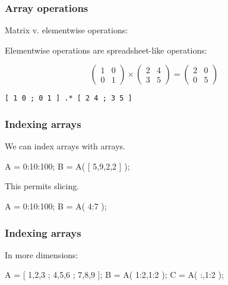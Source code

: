 \documentclass[11pt]{beamer}
\begin{document}
\begin{frame}[fragile]
  \frametitle{Array operations}
  \Enlarge

  \begin{enumerate}
  \myitem  Matrix v. elementwise operations:
    \begin{enumerate}
    \mysubitem  Elementwise operations are spreadsheet-like operations:
    \end{enumerate}
  \end{enumerate}
  $$
\left( \begin{array}{cc}
  1 & 0 \\
  0 & 1
\end{array} \right)
\times
\left( \begin{array}{cc}
  2 & 4 \\
  3 & 5
\end{array} \right)
=
\left( \begin{array}{cc}
  2 & 0 \\
  0 & 5
\end{array} \right)
  $$
  \pause
  \begin{Verbatim}
[ 1 0 ; 0 1 ] .* [ 2 4 ; 3 5 ]
  \end{Verbatim}
\end{frame}

\begin{frame}[fragile]
  \frametitle{Indexing arrays}
  \Enlarge

  \begin{enumerate}
  \myitem  We can index arrays with arrays.
  \end{enumerate}
  \begin{semiverbatim}
A = 0:10:100;
B = A( [ 5,9,2,2 ] );
  \end{semiverbatim}
  \pause
  \begin{enumerate}
  \myitem  This permits slicing.
  \end{enumerate}
  \begin{semiverbatim}
A = 0:10:100;
B = A( 4:7 );
  \end{semiverbatim}
\end{frame}

\begin{frame}[fragile]
  \frametitle{Indexing arrays}
  \Enlarge

  \begin{enumerate}
  \myitem  In more dimensions:
  \end{enumerate}
  \begin{semiverbatim}
A = [ 1,2,3 ; 4,5,6 ; 7,8,9 ];
B = A( 1:2,1:2 );
C = A( :,1:2 );
  \end{semiverbatim}
\end{frame}
\end{document}
